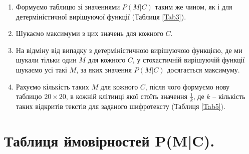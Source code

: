 \documentclass[a4paper,12pt]{article}
\begin{document}
\begin{enumerate}

\item Формуємо таблицю зі значеннями $P(M|C)$ таким же чином, як і для детерміністичної вирішуючої функції (Таблиця \ref{Tab3}).
\item Шукаємо максимуми з цих значень для кожного $C$.  
\item На відміну від випадку з детерміністичною вирішуючою функцією, де ми шукали тільки один $M$ для кожного $C$, у стохастичній вирішуючій функції шукаємо усі такі $M$, за яких значення $P(M|C)$ досягається максимуму.  
\item Рахуємо кількість таких $M$ для кожного $C$, після чого формуємо нову таблицю $20 \times 20$, в кожній клітинці якої стоїть значення $\frac{1}{k}$, де $k$ -- кількість таких відкритів текстів для заданого шифротексту (Таблиця \ref{Tab5}).  


\end{enumerate}

\section{Таблиця ймовірностей P(M|C).}
\end{document}
